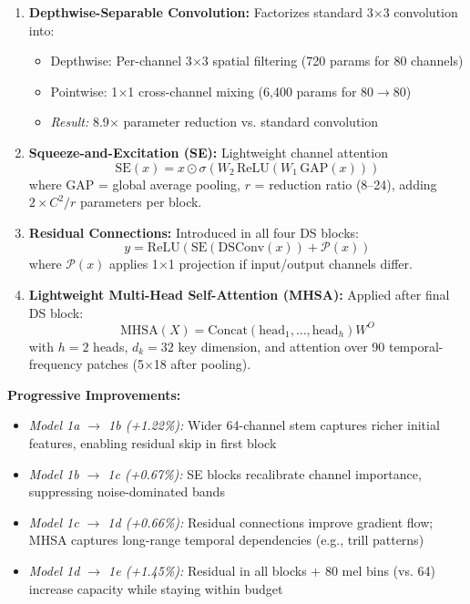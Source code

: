 \documentclass[10pt,a4paper,twoside]{article}
\begin{document}
\begin{enumerate}
	\item \textbf{Depthwise-Separable Convolution:} Factorizes standard 3$\times$3 convolution into:
	\begin{itemize}
		\item Depthwise: Per-channel 3$\times$3 spatial filtering (720 params for 80 channels)
		\item Pointwise: 1$\times$1 cross-channel mixing (6,400 params for 80$\to$80)
		\item \textit{Result:} 8.9$\times$ parameter reduction vs. standard convolution
	\end{itemize}

	\item \textbf{Squeeze-and-Excitation (SE):} Lightweight channel attention~\cite{hu2018squeeze}
	\begin{equation}
		\text{SE}(x) = x \odot \sigma\left(W_2 \, \text{ReLU}(W_1 \, \text{GAP}(x))\right)
	\end{equation}
	where GAP = global average pooling, $r$ = reduction ratio (8--24), adding $2 \times C^2/r$ parameters per block.

	\item \textbf{Residual Connections:} Introduced in all four DS blocks:
	\begin{equation}
		y = \text{ReLU}\left(\text{SE}(\text{DSConv}(x)) + \mathcal{P}(x)\right)
	\end{equation}
	where $\mathcal{P}(x)$ applies 1$\times$1 projection if input/output channels differ.

	\item \textbf{Lightweight Multi-Head Self-Attention (MHSA):} Applied after final DS block:
	\begin{equation}
		\text{MHSA}(X) = \text{Concat}(\text{head}_1, \ldots, \text{head}_h) W^O
	\end{equation}
	with $h=2$ heads, $d_k=32$ key dimension, and attention over 90 temporal-frequency patches (5$\times$18 after pooling).
\end{enumerate}

\noindent\textbf{Progressive Improvements:}
\begin{itemize}
	\item \textit{Model 1a $\to$ 1b (+1.22\%):} Wider 64-channel stem captures richer initial features, enabling residual skip in first block
	\item \textit{Model 1b $\to$ 1c (+0.67\%):} SE blocks recalibrate channel importance, suppressing noise-dominated bands
	\item \textit{Model 1c $\to$ 1d (+0.66\%):} Residual connections improve gradient flow; MHSA captures long-range temporal dependencies (e.g., trill patterns)
	\item \textit{Model 1d $\to$ 1e (+1.45\%):} Residual in all blocks + 80 mel bins (vs. 64) increase capacity while staying within budget
\end{itemize}
\end{document}
